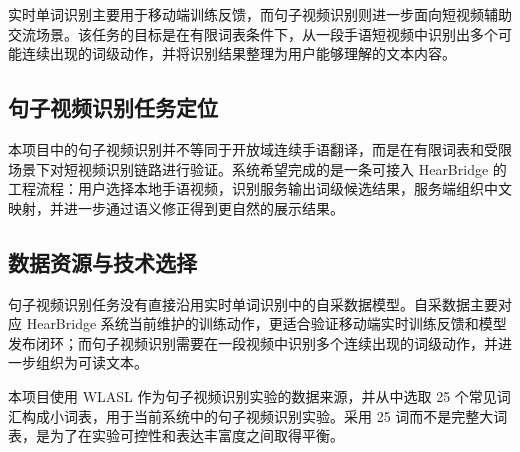 实时单词识别主要用于移动端训练反馈，而句子视频识别则进一步面向短视频辅助交流场景。该任务的目标是在有限词表条件下，从一段手语短视频中识别出多个可能连续出现的词级动作，并将识别结果整理为用户能够理解的文本内容。

\subsection{句子视频识别任务定位}

本项目中的句子视频识别并不等同于开放域连续手语翻译，而是在有限词表和受限场景下对短视频识别链路进行验证。系统希望完成的是一条可接入 HearBridge 的工程流程：用户选择本地手语视频，识别服务输出词级候选结果，服务端组织中文映射，并进一步通过语义修正得到更自然的展示结果。

\subsection{数据资源与技术选择}

句子视频识别任务没有直接沿用实时单词识别中的自采数据模型。自采数据主要对应 HearBridge 系统当前维护的训练动作，更适合验证移动端实时训练反馈和模型发布闭环；而句子视频识别需要在一段视频中识别多个连续出现的词级动作，并进一步组织为可读文本。

本项目使用 WLASL 作为句子视频识别实验的数据来源，并从中选取 25 个常见词汇构成小词表，用于当前系统中的句子视频识别实验。采用 25 词而不是完整大词表，是为了在实验可控性和表达丰富度之间取得平衡。

